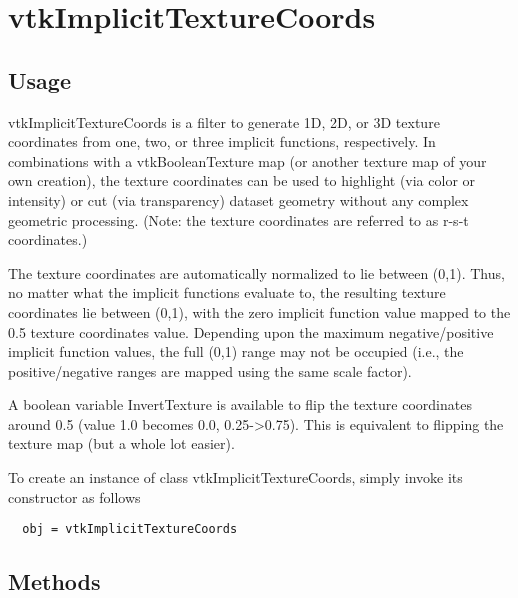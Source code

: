\section{vtkImplicitTextureCoords}

\subsection{Usage}

 vtkImplicitTextureCoords is a filter to generate 1D, 2D, or 3D texture 
 coordinates from one, two, or three implicit functions, respectively. 
 In combinations with a vtkBooleanTexture map (or another texture map of
 your own creation), the texture coordinates can be used to highlight
(via color or intensity) or cut (via transparency) dataset geometry without
 any complex geometric processing. (Note: the texture coordinates are 
 referred to as r-s-t coordinates.)

 The texture coordinates are automatically normalized to lie between (0,1). 
 Thus, no matter what the implicit functions evaluate to, the resulting 
 texture coordinates lie between (0,1), with the zero implicit function 
 value mapped to the 0.5 texture coordinates value. Depending upon the 
 maximum negative/positive implicit function values, the full (0,1) range 
 may not be occupied (i.e., the positive/negative ranges are mapped using 
 the same scale factor).

 A boolean variable InvertTexture is available to flip the texture 
 coordinates around 0.5 (value 1.0 becomes 0.0, 0.25->0.75). This is 
 equivalent to flipping the texture map (but a whole lot easier).

To create an instance of class vtkImplicitTextureCoords, simply
invoke its constructor as follows
\begin{verbatim}
  obj = vtkImplicitTextureCoords
\end{verbatim}
\subsection{Methods}


